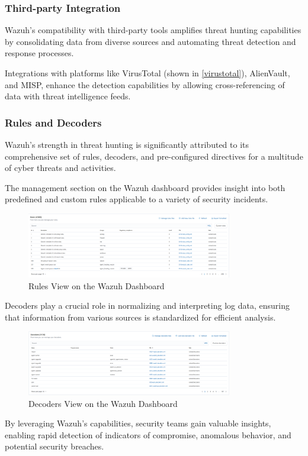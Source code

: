 \subsubsection{Third-party Integration}

Wazuh's compatibility with third-party tools amplifies threat hunting capabilities by consolidating data from diverse sources and automating threat detection and response processes.

Integrations with platforms like VirusTotal (shown in \ref{virustotal}), AlienVault, and MISP, enhance the detection capabilities by allowing cross-referencing of data with threat intelligence feeds.

\subsubsection{Rules and Decoders}

Wazuh's strength in threat hunting is significantly attributed to its comprehensive set of rules, decoders, and pre-configured directives for a multitude of cyber threats and activities.

The management section on the Wazuh dashboard provides insight into both predefined and custom rules applicable to a variety of security incidents.

\begin{figure}[H]
    \centering
    \includegraphics[width=0.8\textwidth]{images/threat-hunting/rules.png}
    \caption{Rules View on the Wazuh Dashboard}
    \label{fig:wazuh-dashboard-rules}
\end{figure}

Decoders play a crucial role in normalizing and interpreting log data, ensuring that information from various sources is standardized for efficient analysis.

\begin{figure}[H]
    \centering
    \includegraphics[width=0.8\textwidth]{images/threat-hunting/decoders.png}
    \caption{Decoders View on the Wazuh Dashboard}
    \label{fig:default-decoder-details}
\end{figure}

By leveraging Wazuh's capabilities, security teams gain valuable insights, enabling rapid detection of indicators of compromise, anomalous behavior, and potential security breaches.
